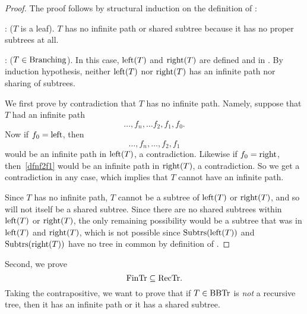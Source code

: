 \begin{proof}
The proof follows by structural induction on the
definition of \rectr:

: ($T$ is a leaf).  $T$ has no infinite path
or shared subtree because it has no proper subtrees at all.

: ($T \in \text{Branching}$).  In this case,
$\text{left}(T)$ and $\text{right}(T)$ are defined and in \rectr.  By
induction hypothesis, neither $\text{left}(T)$ nor $\text{right}(T)$ has an
infinite path nor sharing of subtrees.

We first prove by contradiction that $T$ has no infinite path.
Namely, suppose that $T$ had an infinite path
\[
\dots,f_n,\dots f_2,f_1,f_0.
\]
Now if $f_0 = \leftsub$, then
\begin{equation}\label{dfnf2f1}
\dots,f_n,\dots,f_2,f_1
\end{equation}
would be an infinite path in $\text{left}(T)$, a contradiction.  Likewise
if $f_0 = \rightsub$, then~\eqref{dfnf2f1} would be an infinite path
in $\text{right}(T)$, a contradiction.  So we get a contradiction in any
case, which implies that $T$ cannot have an infinite path.

Since $T$ has no infinite path, $T$ cannot be a subtree of
$\text{left}(T)$ or $\text{right}(T)$, and so will not itself be a
shared subtree.  Since there are no shared subtrees within
$\text{left}(T)$ or $\text{right}(T)$, the only remaining possibility
would be a subtree that was in $\text{left}(T)$ and $\text{right}(T)$,
which is not possible since $\text{Subtrs}(\text{left}(T))$ and
$\text{Subtrs}(\text{right}(T))$ have no tree in common by definition of
\rectr.
\end{proof}

Second, we prove
\begin{equation}\label{fintrsubrectr}
\text{FinTr} \subseteq \text{RecTr}.
\end{equation}
Taking the contrapositive, we want to prove that if $T \in \text{BBTr}$ is
\emph{not} a recursive tree, then it has an infinite path or it has a
shared subtree.

